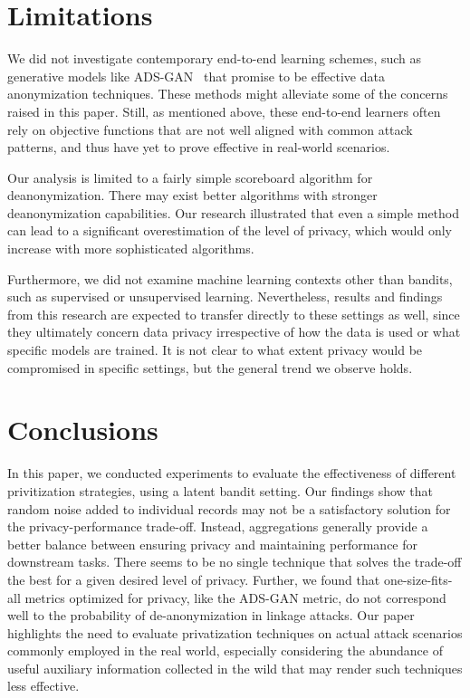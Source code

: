 \documentclass{article}
\begin{document}
\section{Limitations}
We did not investigate contemporary end-to-end learning schemes, such as generative models like ADS-GAN~\citep{Yoon2020} that promise to be effective data anonymization techniques. These methods might alleviate some of the concerns raised in this paper. Still, as mentioned above, these end-to-end learners often rely on objective functions that are not well aligned with common attack patterns, and thus have yet to prove effective in real-world scenarios.

Our analysis is limited to a fairly simple scoreboard algorithm for deanonymization. There may exist better algorithms with stronger deanonymization capabilities. Our research illustrated that even a simple method can lead to a significant overestimation of the level of privacy, which would only increase with more sophisticated algorithms.

Furthermore, we did not examine machine learning contexts other than bandits, such as supervised or unsupervised learning. Nevertheless, results and findings from this research are expected to transfer directly to these settings as well, since they ultimately concern data privacy irrespective of how the data is used or what specific models are trained. It is not clear to what extent privacy would be compromised in specific settings, but the general trend we observe holds. 

\section{Conclusions}

In this paper, we conducted experiments to evaluate the effectiveness of different privitization strategies, using a latent bandit setting. Our findings show that random noise added to individual records may not be a satisfactory solution for the privacy-performance trade-off. Instead, aggregations generally provide a better balance between ensuring privacy and maintaining performance for downstream tasks. There seems to be no single technique that solves the trade-off the best for a given desired level of privacy. Further, we found that one-size-fits-all metrics optimized for privacy, like the ADS-GAN metric, do not correspond well to the probability of de-anonymization in linkage attacks. Our paper highlights the need to evaluate privatization techniques on actual attack scenarios commonly employed in the real world, especially considering the abundance of useful auxiliary information collected in the wild that may render such techniques less effective.
\end{document}
